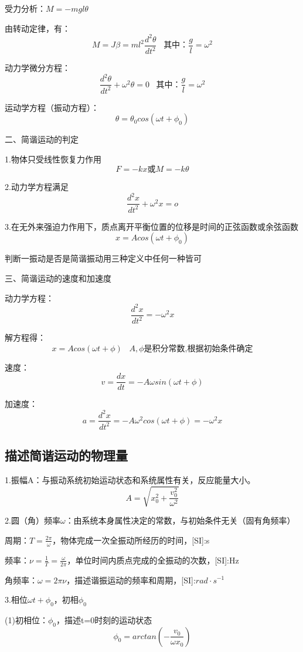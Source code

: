 \documentclass[UTF8]{article}
\begin{document}
    受力分析：$M = -mgl\theta$

    由转动定律，有：
    \[M = J\beta = ml^2\frac{d^2\theta}{dt^2}\;\;\;\mbox{其中：}\frac{g}{l} = \omega^2\]

    动力学微分方程：
    \[\frac{d^2\theta}{dt^2} + \omega^2\theta = 0\;\;\;\mbox{其中：}\frac{g}{l} = \omega^2\]

    运动学方程（振动方程）：
    \[\theta = \theta_0cos(\omega t + \phi_0)\]

    二、简谐运动的判定

    1.物体只受线性恢复力作用
    \[F = -kx\mbox{或}M= -k\theta\]

    2.动力学方程满足
    \[\frac{d^2x}{dt^2} + \omega^2x = o\]

    3.在无外来强迫力作用下，质点离开平衡位置的位移是时间的正弦函数或余弦函数
    \[x = Acos(\omega t + \phi_0)\]

    判断一振动是否是简谐振动用三种定义中任何一种皆可

    三、简谐运动的速度和加速度

    动力学方程：
    \[\frac{d^2x}{dt^2} = -\omega^2 x\]

    解方程得：
    \[x = Acos(\omega t + \phi)\;\;\;A,\phi\mbox{是积分常数,根据初始条件确定}\]

    速度：
    \[v = \frac{dx}{dt} = -A\omega sin(\omega t + \phi)\]

    加速度：
    \[a = \frac{d^2x}{dt^2} = -A\omega^2cos(\omega t + \phi) = -\omega^2x\]

\subsection{描述简谐运动的物理量}

    1.振幅A：与振动系统初始运动状态和系统属性有关，反应能量大小。
    \[A = \sqrt{x_0^2 + \frac{v_0^2}{\omega^2}}\]

    2.圆（角）频率$\omega$：由系统本身属性决定的常数，与初始条件无关（固有角频率）

    周期：$T = \frac{2\pi}{\omega}$，物体完成一次全振动所经历的时间，[SI]:s

    频率：$\nu = \frac{1}{T} = \frac{\omega}{2\pi}$，单位时间内质点完成的全振动的次数，[SI]:Hz

    角频率：$\omega = 2\pi\nu$，描述谐振运动的频率和周期，[SI]:$rad\cdot s^{-1}$

    3.相位$\omega t + \phi_0$，初相$\phi_0$

    (1)初相位：$\phi_0$，描述t=0时刻的运动状态
    \[\phi_0 = arctan(-\frac{v_0}{\omega x_0})\]
\end{document}
